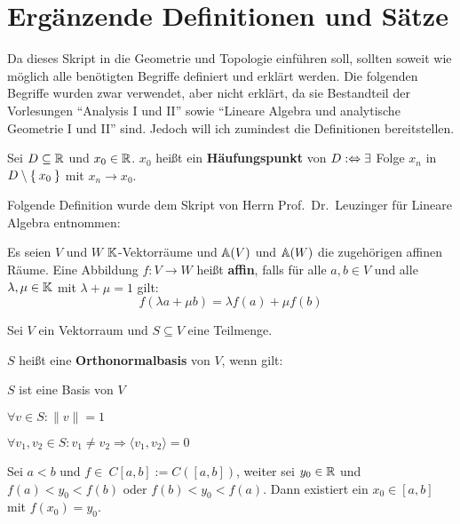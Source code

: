 \chapter*{Ergänzende Definitionen und Sätze}

Da dieses Skript in die Geometrie und Topologie einführen soll, sollten soweit
wie möglich alle benötigten Begriffe definiert und erklärt werden. Die folgenden
Begriffe wurden zwar verwendet, aber nicht erklärt, da sie Bestandteil der
Vorlesungen \enquote{Analysis I und II} sowie \enquote{Lineare Algebra und analytische Geometrie I und II}
sind. Jedoch will ich zumindest die Definitionen bereitstellen.

\begin{definition}%
	Sei $D \subseteq \mathbb{R}$ und $x_0 \in \mathbb{R}$. $x_0$ heißt ein \textbf{Häufungspunkt}
	von $D :\Leftrightarrow \exists$ Folge $x_n$ in $D \setminus \Set{x_0}$ mit $x_n \rightarrow x_0$.
\end{definition}

Folgende Definition wurde dem Skript von Herrn Prof.~Dr.~Leuzinger für
Lineare Algebra entnommen:

\begin{definition}%
	Es seien $V$ und $W$ $\mathbb{K}$-Vektorräume und $\mathbb{A}(V)$ und $\mathbb{A}(W)$ die
	zugehörigen affinen Räume. Eine Abbildung $f:V \rightarrow W$ heißt \textbf{affin},
	falls für alle $a, b \in V$ und alle $\lambda, \mu \in \mathbb{K}$ mit $\lambda + \mu = 1$ gilt:
	\[f(\lambda a + \mu b) = \lambda f(a) + \mu f(b)\]
\end{definition}

\begin{definition}%
	Sei $V$ ein Vektorraum und $S \subseteq V$ eine Teilmenge.

	$S$ heißt eine \textbf{Orthonormalbasis} von $V$, wenn gilt:
	\begin{defenumprops}
		\item $S$ ist eine Basis von $V$
		\item $\forall v \in S: \|v\| = 1$
		\item $\forall v_1, v_2 \in S: v_1 \neq v_2 \Rightarrow \langle v_1, v_2 \rangle = 0$
	\end{defenumprops}
\end{definition}

\begin{satz*}[Zwischenwertsatz]%
	Sei $a<b$ und $f \in\ C[a, b]:=C([a, b])$, weiter sei $y_0 \in \mathbb{R}$ und
	$f(a) < y_0 < f(b)$ oder $f(b) < y_0 < f(a)$. Dann existiert ein
	$x_0 \in [a, b]$ mit $f(x_0) = y_0$.
\end{satz*}


